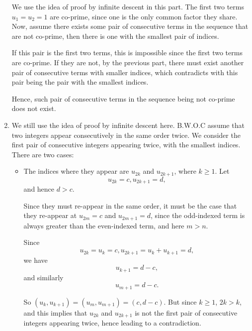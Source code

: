 \begin{enumerate}
          We use the idea of proof by infinite descent in this part. The first two terms \(u_1 = u_2 = 1\) are co-prime, since one is the only common factor they share. Now, assume there exists some pair of consecutive terms in the sequence that are not co-prime, then there is one with the smallest pair of indices.

          If this pair is the first two terms, this is impossible since the first two terms are co-prime. If they are not, by the previous part, there must exist another pair of consecutive terms with smaller indices, which contradicts with this pair being the pair with the smallest indices.

          Hence, such pair of consecutive terms in the sequence being not co-prime does not exist.

    \item We still use the idea of proof by infinite descent here. B.W.O.C assume that two integers appear consecutively in the same order twice. We consider the first pair of consecutive integers appearing twice, with the smallest indices. There are two cases:
          \begin{itemize}
              \item The indices where they appear are \(u_{2k}\) and \(u_{2k + 1}\), where \(k \geq 1\). Let
                    \[
                        u_{2k} = c, u_{2k + 1} = d,
                    \]
                    and hence \(d > c\).

                    Since they must re-appear in the same order, it must be the case that they re-appear at \(u_{2m} = c\) and \(u_{2m + 1} = d\), since the odd-indexed term is always greater than the even-indexed term, and here \(m > n\).

                    Since
                    \[
                        u_{2k} = u_k = c, u_{2k + 1} = u_k + u_{k + 1} = d,
                    \]
                    we have
                    \[
                        u_{k + 1} = d - c,
                    \]
                    and similarly
                    \[
                        u_{m + 1} = d - c.
                    \]

                    So \((u_k, u_{k + 1}) = (u_m, u_{m + 1}) = (c, d - c)\). But since \(k \geq 1\), \(2k > k\), and this implies that \(u_{2k}\) and \(u_{2k + 1}\) is not the first pair of consecutive integers appearing twice, hence leading to a contradiction.


\end{itemize}
\end{enumerate}
